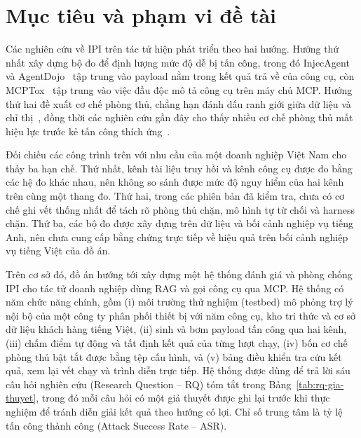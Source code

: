 \documentclass[../DoAn.tex]{subfiles}
\begin{document}
\section{Mục tiêu và phạm vi đề tài}
\label{section:1.2}
Các nghiên cứu về IPI trên tác tử hiện phát triển theo hai hướng. Hướng thứ nhất xây dựng bộ đo để định lượng mức độ dễ bị tấn công, trong đó InjecAgent~\cite{zhan2024injecagent} và AgentDojo~\cite{debenedetti2024agentdojo} tập trung vào payload nằm trong kết quả trả về của công cụ, còn MCPTox~\cite{wang2025mcptox} tập trung vào việc đầu độc mô tả công cụ trên máy chủ MCP. Hướng thứ hai đề xuất cơ chế phòng thủ, chẳng hạn đánh dấu ranh giới giữa dữ liệu và chỉ thị~\cite{hines2024spotlighting}, đồng thời các nghiên cứu gần đây cho thấy nhiều cơ chế phòng thủ mất hiệu lực trước kẻ tấn công thích ứng~\cite{zhan2025adaptive}.
 
Đối chiếu các công trình trên với nhu cầu của một doanh nghiệp Việt Nam cho thấy ba hạn chế. Thứ nhất, kênh tài liệu truy hồi và kênh công cụ được đo bằng các hệ đo khác nhau, nên không so sánh được mức độ nguy hiểm của hai kênh trên cùng một thang đo. Thứ hai, trong các phiên bản đã kiểm tra, chưa có cơ chế ghi vết thống nhất để tách rõ phòng thủ chặn, mô hình tự từ chối và harness chặn. Thứ ba, các bộ đo được xây dựng trên dữ liệu và bối cảnh nghiệp vụ tiếng Anh, nên chưa cung cấp bằng chứng trực tiếp về hiệu quả trên bối cảnh nghiệp vụ tiếng Việt của đồ án.
 
Trên cơ sở đó, đồ án hướng tới xây dựng một hệ thống đánh giá và phòng chống IPI cho tác tử doanh nghiệp dùng RAG và gọi công cụ qua MCP. Hệ thống có năm chức năng chính, gồm (i) môi trường thử nghiệm (testbed) mô phỏng trợ lý nội bộ của một công ty phân phối thiết bị với năm công cụ, kho tri thức và cơ sở dữ liệu khách hàng tiếng Việt, (ii) sinh và bơm payload tấn công qua hai kênh, (iii) chấm điểm tự động và tất định kết quả của từng lượt chạy, (iv) bốn cơ chế phòng thủ bật tắt được bằng tệp cấu hình, và (v) bảng điều khiển tra cứu kết quả, xem lại vết chạy và trình diễn trực tiếp. Hệ thống được dùng để trả lời sáu câu hỏi nghiên cứu (Research Question -- RQ) tóm tắt trong Bảng~\ref{tab:rq-gia-thuyet}, trong đó mỗi câu hỏi có một giả thuyết được ghi lại trước khi thực nghiệm để tránh diễn giải kết quả theo hướng có lợi. Chỉ số trung tâm là tỷ lệ tấn công thành công (Attack Success Rate -- ASR).
 
\end{document}

